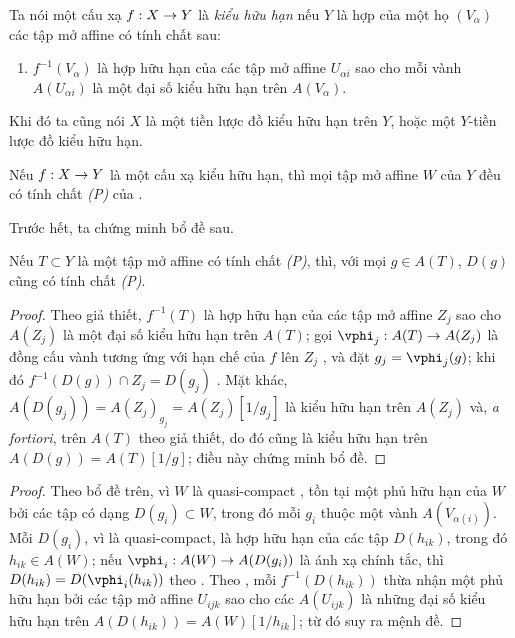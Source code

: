 \documentclass[oneside]{amsart}
\makeatletter
\newcommand{\ega@arrow}[2]{\mathchoice{#1}{#2}{#2}{#2}}
\renewcommand{\to}{\ega@arrow{\longrightarrow}{\rightarrow}}
\let\EGAOriginalLabel\label
\renewcommand{\label}[1]{\phantomsection\EGAOriginalLabel{#1}}
\newcommand*{\ega@errmark}[1]{\textbf{Err}\textsubscript{#1}}
\newcommand{\erratum}[2][]{{#2}\marginpar{\footnotesize\ega@errmark{#1}}}
\makeatother
\begin{document}
\begin{definition}[6.3.1]
\label{I.6.3.1}
Ta nói một cấu xạ $f:X\to Y$ là \emph{kiểu hữu hạn} nếu $Y$ là hợp của một họ $(V_\alpha)$ các tập mở affine có tính chất sau:
\begin{enumerate}
  \item[(P)] $f^{-1}(V_\alpha)$ là hợp hữu hạn của các tập mở affine $U_{\alpha i}$ sao cho mỗi vành $A(U_{\alpha i})$ là một đại số kiểu hữu hạn trên $A(V_\alpha)$.
\end{enumerate}
Khi đó ta cũng nói $X$ là một tiền lược đồ kiểu hữu hạn trên $Y$, hoặc một $Y$-tiền lược đồ kiểu hữu hạn.
\end{definition}

\begin{proposition}[6.3.2]
\label{I.6.3.2}
Nếu $f:X\to Y$ là một cấu xạ kiểu hữu hạn, thì mọi tập mở affine $W$ của $Y$ đều có tính chất \emph{(P)} của .
\end{proposition}

Trước hết, ta chứng minh bổ đề sau.
\begin{lemma}[6.3.2.1]
\label{I.6.3.2.1}
Nếu $T\subset Y$ là một tập mở affine có tính chất \emph{(P)}, thì, với mọi $g\in A(T)$, $D(g)$ cũng có tính chất \emph{(P)}.
\end{lemma}

\begin{proof}
Theo giả thiết, $f^{-1}(T)$ là hợp hữu hạn của các tập mở affine $Z_j$ sao cho $A(Z_j)$ là một đại số kiểu hữu hạn trên $A(T)$;
gọi $\vphi_j:A(T)\to A(Z_j)$ là đồng cấu vành tương ứng với hạn chế của $f$ lên $Z_j$ , và đặt $g_j=\vphi_j(g)$;
khi đó $f^{-1}(D(g))\cap Z_j=D(g_j)$ .
Mặt khác, $A(D(g_j))=A(Z_j)_{g_j}=A(Z_j)[1/g_j]$ là kiểu hữu hạn trên $A(Z_j)$ và, \emph{a fortiori}, trên $A(T)$ theo giả thiết, do đó cũng là kiểu hữu hạn trên $A(D(g))=A(T)[1/g]$; điều này chứng minh bổ đề.
\end{proof}

\begin{proof}
Theo bổ đề trên, vì $W$ là quasi-compact , tồn tại một phủ hữu hạn của $W$ bởi các tập có dạng \erratum[II]{$D(g_i)\subset W$}, trong đó mỗi $g_i$ thuộc một vành $A(V_{\alpha(i)})$.
Mỗi $D(g_i)$, vì là quasi-compact, là hợp hữu hạn của các tập $D(h_{ik})$, trong đó $h_{ik}\in A(W)$;
nếu $\vphi_i:A(W)\to A(D(g_i))$ là ánh xạ chính tắc, thì $D(h_{ik})=D(\vphi_i(h_{ik}))$ theo .
Theo , mỗi $f^{-1}(D(h_{ik}))$ thừa nhận một phủ hữu hạn bởi các tập mở affine $U_{ijk}$ sao cho các $A(U_{ijk})$ là những đại số kiểu hữu hạn trên $A(D(h_{ik}))=A(W)[1/h_{ik}]$; từ đó suy ra mệnh đề.
\end{proof}
\end{document}
